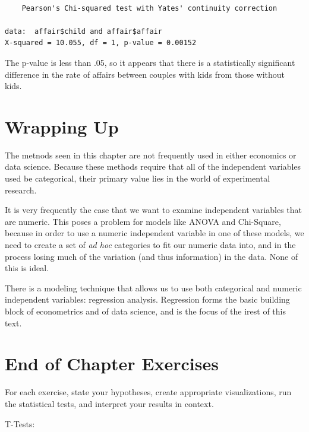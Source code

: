 \documentclass[
  letterpaper,
]{book}
\begin{document}
\begin{verbatim}

    Pearson's Chi-squared test with Yates' continuity correction

data:  affair$child and affair$affair
X-squared = 10.055, df = 1, p-value = 0.00152
\end{verbatim}

The p-value is less than .05, so it appears that there is a
statistically significant difference in the rate of affairs between
couples with kids from those without kids.

\section{Wrapping Up}\label{wrapping-up-3}

The metnods seen in this chapter are not frequently used in either
economics or data science. Because these methods require that all of the
independent variables used be categorical, their primary value lies in
the world of experimental research.

It is very frequently the case that we want to examine independent
variables that are numeric. This poses a problem for models like ANOVA
and Chi-Square, because in order to use a numeric independent variable
in one of these models, we need to create a set of \emph{ad hoc}
categories to fit our numeric data into, and in the process losing much
of the variation (and thus information) in the data. None of this is
ideal.

There is a modeling technique that allows us to use both categorical and
numeric independent variables: regression analysis. Regression forms the
basic building block of econometrics and of data science, and is the
focus of the irest of this text.

\section{End of Chapter Exercises}\label{end-of-chapter-exercises-2}

For each exercise, state your hypotheses, create appropriate
visualizations, run the statistical tests, and interpret your results in
context.

T-Tests:
\end{document}
